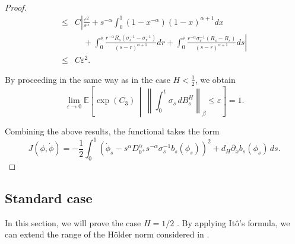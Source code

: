 \documentclass[preprint,12pt]{elsarticle}
\theoremstyle{definition}  %
\theoremstyle{plain}  %
\begin{document}
\begin{proof}
\begin{align*}
     \leq & C\left| \frac{\varepsilon^2}{s^\alpha}+s^{-\alpha}\int_0^1 (1-x^{-\alpha})(1-x)^{\alpha+1}dx  \right. \\
     &\quad + \left.  \int_0^s \frac{r^{-\alpha} R_s(\sigma_s^{-1}-\sigma_r^{-1})}{(s-r)^{\alpha+1}}dr+\int_0^s \frac{r^{-\alpha}\sigma_r^{-1}(R_s-R_r)}{(s-r)^{\alpha+1}}ds   \right|\\
     \leq & C \varepsilon^2.
\end{align*}



By proceeding in the same way as in the case $H<\tfrac{1}{2}$, we obtain 
\[
\lim_{\varepsilon \to 0} \mathbb{E} \left[ \exp(C_3) \,\middle|\, \left\| \int_0^t \sigma_s\, dB^H_s \right\|_\beta \leq \varepsilon \right] = 1.
\]




Combining the above results, the functional takes the form  
\[
J(\phi,\dot{\phi}) = -\frac{1}{2} \int_0^1 \left(\dot{\phi}_s -s^{\alpha} D_{0^+}^\alpha s^{-\alpha} \sigma_s^{-1}  b_s(\phi_s)  \right)^2 +d_H\partial_x b_s(\phi_s)\, ds .
\]




\end{proof}

\subsection{Standard case }


In this section, we will prove the case $H=1/2$ .
By applying Itô's formula, we can extend the range of the H\"older norm considered in \cite{zhang2024onsagermachlupfunctionalstochasticdifferential}.
\end{document}
